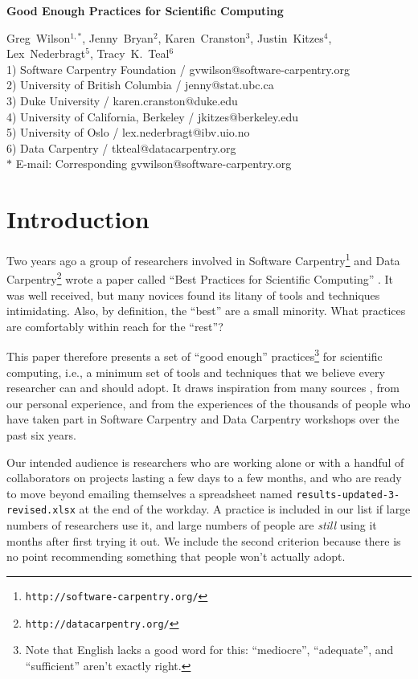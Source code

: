 \documentclass[10pt]{article}
\date{}
\newcommand{\withurl}[2]{{#1}\footnote{\texttt{#2}}}
\begin{document}
\begin{flushleft}
{\Large
\textbf{Good Enough Practices for Scientific Computing}
}

{Greg~Wilson}$^{1,\ast}$,
{Jenny~Bryan}$^{2}$,
{Karen~Cranston}$^{3}$,
{Justin~Kitzes}$^{4}$,
{Lex~Nederbragt}$^{5}$,
{Tracy~K.~Teal}$^{6}$
\\
1) Software Carpentry Foundation / gvwilson@software-carpentry.org
\\
2) University of British Columbia / jenny@stat.ubc.ca
\\
3) Duke University / karen.cranston@duke.edu
\\
4) University of California, Berkeley / jkitzes@berkeley.edu
\\
5) University of Oslo / lex.nederbragt@ibv.uio.no
\\
6) Data Carpentry / tkteal@datacarpentry.org
\\
$\ast$ E-mail: Corresponding gvwilson@software-carpentry.org
\end{flushleft}

\section{Introduction}\label{sec:introduction}

Two years ago a group of researchers involved in \withurl{Software
Carpentry}{http://software-carpentry.org/} and \withurl{Data
Carpentry}{http://datacarpentry.org/} wrote a paper called
``Best Practices for Scientific Computing'' \cite{wilson2014}.
It was well received, but many novices found its
litany of tools and techniques intimidating.  Also, by definition, the
``best'' are a small minority.
What practices are comfortably within reach for the ``rest''?

This paper therefore presents a set of ``good enough''
practices\footnote{Note that English lacks a good word for this:
  ``mediocre'', ``adequate'', and ``sufficient'' aren't exactly
  right.} for scientific computing, i.e., a minimum set of tools and
techniques that we believe every researcher can and should adopt. It
draws inspiration from many sources
\cite{gentzkow2014,noble2009,brown2015,wickham2014,kitzes2016,sandve2013,hart2015},
from our personal experience, and from the experiences of the
thousands of people who have taken part in Software Carpentry and
Data Carpentry workshops over the past six years.

Our intended audience is researchers who are working alone or with a
handful of collaborators on projects lasting a few days to a few
months, and who are ready to move beyond emailing themselves a spreadsheet
named \texttt{results-updated-3-revised.xlsx} at the end of the workday. A
practice is included in our list if large numbers of researchers use
it, and large numbers of people are \emph{still} using it months
after first trying it out. We include the second criterion because
there is no point recommending something that people won't actually
adopt.
\end{document}
